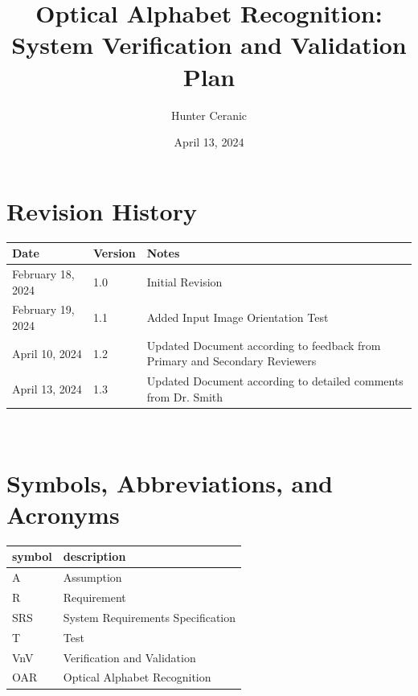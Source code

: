 \documentclass[12pt, titlepage]{article}
\begin{document}
\title{Optical Alphabet Recognition: System Verification and Validation Plan} 
\author{Hunter Ceranic}
\date{April 13, 2024}
	
\maketitle


\section*{Revision History}

\begin{tabularx}{\textwidth}{p{3cm}p{2cm}X}
\toprule {\bf Date} & {\bf Version} & {\bf Notes}\\
\midrule
February 18, 2024 & 1.0 & Initial Revision\\
February 19, 2024 & 1.1 & Added Input Image Orientation Test\\
April 10, 2024 & 1.2 & Updated Document according to feedback from Primary and Secondary Reviewers\\
April 13, 2024 & 1.3 & Updated Document according to detailed comments from Dr. Smith\\
\bottomrule
\end{tabularx}

~\\

\newpage

\tableofcontents

\newpage

\section{Symbols, Abbreviations, and Acronyms}

\renewcommand{\arraystretch}{1.2}
\begin{tabular}{l l} 
  \toprule		
  \textbf{symbol} & \textbf{description}\\
  \midrule 
  A & Assumption\\
  R & Requirement\\
  SRS & System Requirements Specification\\
  T & Test\\
  VnV & Verification and Validation\\
  OAR & Optical Alphabet Recognition\\
  \bottomrule
\end{tabular}\\
\end{document}
